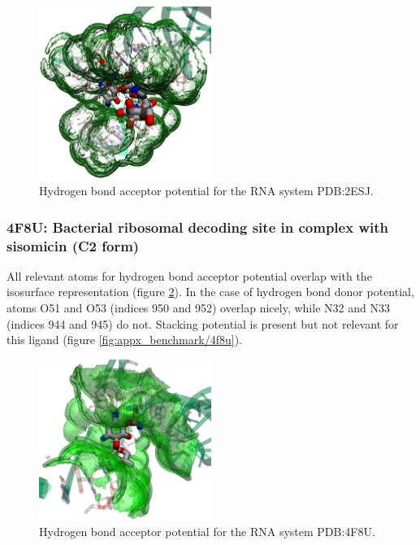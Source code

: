       \begin{figure}[H]
        \centering
        \includegraphics[width=0.5\textwidth]{figures/results/benchmark_rna/2esj.png}
        \caption{\label{fig:benchmark/2esj} Hydrogen bond acceptor potential for the RNA system PDB:2ESJ.}
      \end{figure}

    \subsubsection{4F8U: Bacterial ribosomal decoding site in complex with sisomicin (C2 form)}
      All relevant atoms for hydrogen bond acceptor potential overlap with the isosurface representation (figure \ref{fig:benchmark/4f8u}). In the case of hydrogen bond donor potential, atoms O51 and O53 (indices 950 and 952) overlap nicely, while N32 and N33 (indices 944 and 945) do not. Stacking potential is present but not relevant for this ligand (figure \ref{fig:appx_benchmark/4f8u}).

      \begin{figure}[H]
        \centering
        \includegraphics[width=0.5\textwidth]{figures/results/benchmark_rna/4f8u.png}
        \caption{\label{fig:benchmark/4f8u} Hydrogen bond acceptor potential for the RNA system PDB:4F8U.}
      \end{figure}


